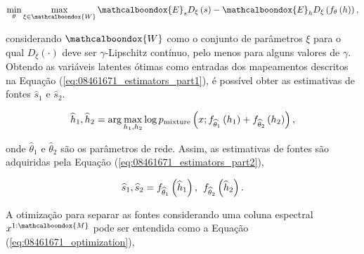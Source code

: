 \begin{equation}
    \min_{\theta}\max_{\xi\in\mathcalboondox{W}}\mathcalboondox{E}_{s}D_{\xi}\left(s\right) - \mathcalboondox{E}_{h}D_{\xi}\left(f_{\theta}\left(h\right)\right),
    \label{eq:08461671_minimax_optimized}
    \vspace{0.2cm}
\end{equation}


\noindent considerando $\mathcalboondox{W}$ como o conjunto de parâmetros $\xi$ para o qual $D_{\xi}\left(\cdot\right)$ deve ser $\gamma$-Lipschitz contínuo, pelo menos para alguns valores de $\gamma$. Obtendo as variáveis latentes ótimas como entradas dos mapeamentos
 descritos na Equação (\ref{eq:08461671_estimators_part1}), é possível obter as estimativas de fontes $\widehat{s}_{1}$ e $\widehat{s}_{2}$.

\begin{equation}
    \widehat{h}_{1}, \widehat{h}_{2} = \arg \max_{h_{1}, h_{2}} \log p_{\text{mixture}}\left(x; f_{\widehat{\theta}_{1}}\left(h_{1}\right)+f_{\widehat{\theta}_{2}}\left(h_{2}\right)\right),
    \label{eq:08461671_estimators_part1}
    \vspace{0.2cm}
\end{equation}

\noindent onde $\widehat{\theta}_{1}$ e $\widehat{\theta}_{2}$ são os parâmetros de rede. Assim, as estimativas de fontes são adquiridas pela Equação (\ref{eq:08461671_estimators_part2}),

\begin{equation}
    \widehat{s}_{1}, \widehat{s}_{2} = f_{\widehat{\theta}_{1}}\left(\widehat{h}_{1}\right),\hspace{0.15cm} f_{\widehat{\theta}_{2}}\left(\widehat{h}_{2}\right).
    \label{eq:08461671_estimators_part2}
    \vspace{0.2cm}
\end{equation}

A otimização para separar as fontes considerando uma coluna espectral $x^{1:\mathcalboondox{M}}$ pode ser entendida como a Equação (\ref{eq:08461671_optimization}),


